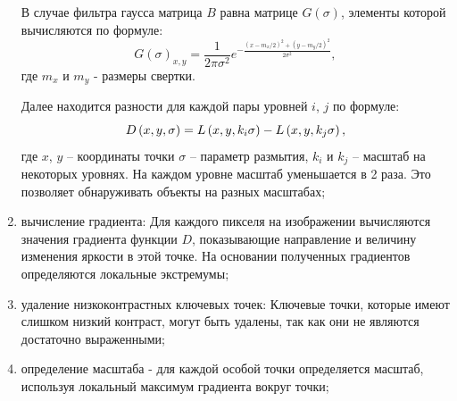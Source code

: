 \documentclass[14pt, a4paper]{extreport}
\begin{document}
\begin{enumerate}[label={\arabic*)}]
	В случае фильтра гаусса матрица $B$ равна матрице $G(\sigma)$, элементы которой вычисляются по формуле:
	\begin{equation}
		G(\sigma)_{x,y} = \frac{1}{2\pi\sigma^2}e^{-\frac{(x-m_x/2)^2 + (y-m_y/2)^2}{2\sigma^2}}, 
		\label{eq:G(sigma)}
	\end{equation} 
	где $m_x$ и $m_y$ - размеры свертки.

	Далее находится разности для каждой пары уровней $i$, $j$ по формуле:
	\vspace*{-1.1cm}
	\begin{equation*}
		D\left(x,y,\sigma \right)=L\left(x,y,k_{i}\sigma \right)-L\left(x,y,k_{j}\sigma \right),
		\label{D(x,y,sigma)}
		\vspace*{-0.5cm}
	\end{equation*}
	где $x$, $y$ -- координаты точки $\sigma$ -- параметр размытия, $k_i$ и $k_j$ -- масштаб на некоторых уровнях. На каждом уровне масштаб уменьшается в 2 раза. Это позволяет обнаруживать объекты на разных масштабах;
	
	\item вычисление градиента: Для каждого пикселя на изображении вычисляются значения градиента функции $D$, показывающие направление и величину изменения яркости в этой точке. На основании полученных градиентов определяются локальные экстремумы;
	
	\item удаление низкоконтрастных ключевых точек: Ключевые точки, которые имеют слишком низкий контраст, могут быть удалены, так как они не являются достаточно выраженными;
	
	\item определение масштаба - для каждой особой точки определяется масштаб, используя локальный максимум градиента вокруг точки;
	

\end{enumerate}
\end{document}
